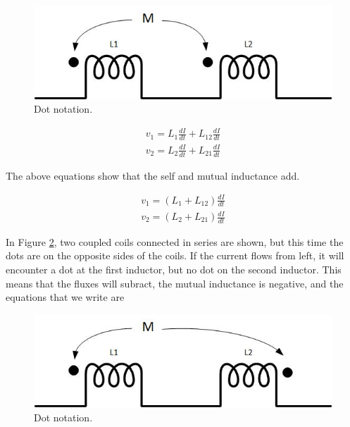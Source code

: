 \documentclass{ximera}
\begin{document}
 
\begin{figure}[htbp]
\begin{center}
\includegraphics[scale=0.8]{../jpg/CoupledCoilsCircuit.jpg}
\end{center}
\caption{Dot notation.}
\label{fig:DotNotation1}
\end{figure}





\begin{eqnarray}
v_1=  L_1 \frac{dI}{dt} + L_{12} \frac{dI}{dt} \\
v_2= L_2 \frac{dI}{dt} + L_{21} \frac{dI}{dt}
\end{eqnarray}

The above equations show that the self and mutual inductance add.


\begin{eqnarray}
v_1=  (L_1  + L_{12}) \frac{dI}{dt} \\
v_2= (L_2 + L_{21}) \frac{dI}{dt}
\end{eqnarray}


In Figure \ref{fig:DotNotation2}, two coupled coils connected in series are shown, but this time the dots are on the opposite sides of the coils. If the current flows from left, it will encounter a dot  at the first inductor, but no dot on the second inductor. This means that the fluxes will subract, the mutual inductance is negative, and the equations that we write are

 


\begin{figure}[htbp]
\begin{center}
\includegraphics[scale=0.8]{../jpg/CoupledCoilsCircuit2.jpg}
\end{center}
\caption{Dot notation.}
\label{fig:DotNotation2}
\end{figure}
\end{document}
